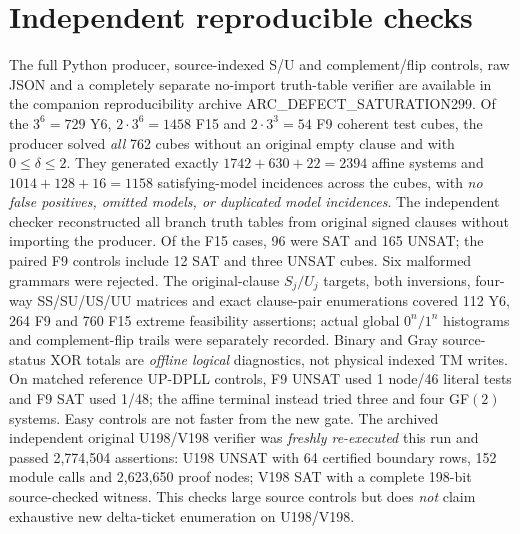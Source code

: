 \documentclass[11pt]{article}
\begin{document}
\section{Independent reproducible checks}
The full Python producer, source-indexed S/U and complement/flip controls, raw JSON and a completely separate no-import truth-table verifier are available in the companion reproducibility archive ARC\_DEFECT\_SATURATION299. Of the $3^6=729$ Y6, $2\cdot3^6=1458$ F15 and $2\cdot3^3=54$ F9 coherent test cubes, the producer solved \emph{all} 762 cubes without an original empty clause and with $0\le\delta\le2$. They generated exactly $1742+630+22=2394$ affine systems and $1014+128+16=1158$ satisfying-model incidences across the cubes, with \emph{no false positives, omitted models, or duplicated model incidences}. The independent checker reconstructed all branch truth tables from original signed clauses without importing the producer. Of the F15 cases, 96 were SAT and 165 UNSAT; the paired F9 controls include 12 SAT and three UNSAT cubes. Six malformed grammars were rejected.
The original-clause $S_j/U_j$ targets, both inversions, four-way SS/SU/US/UU matrices and exact clause-pair enumerations covered 112 Y6, 264 F9 and 760 F15 extreme feasibility assertions; actual global $0^n/1^n$ histograms and complement-flip trails were separately recorded. Binary and Gray source-status XOR totals are \emph{offline logical} diagnostics, not physical indexed TM writes. On matched reference UP-DPLL controls, F9 UNSAT used 1 node/46 literal tests and F9 SAT used 1/48; the affine terminal instead tried three and four GF$(2)$ systems. Easy controls are not faster from the new gate.
The archived independent original U198/V198 verifier was \emph{freshly re-executed} this run and passed 2,774,504 assertions: U198 UNSAT with 64 certified boundary rows, 152 module calls and 2,623,650 proof nodes; V198 SAT with a complete 198-bit source-checked witness. This checks large source controls but does \emph{not} claim exhaustive new delta-ticket enumeration on U198/V198.
\end{document}
